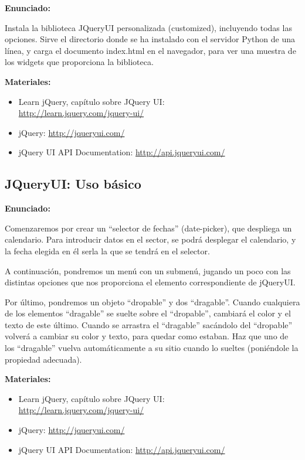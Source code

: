 \textbf{Enunciado:}

Instala la biblioteca JQueryUI personalizada (customized), incluyendo todas las opciones. Sirve el directorio donde se ha instalado con el servidor Python de una línea, y carga el documento index.html en el navegador, para ver una muestra de los widgets que proporciona la biblioteca.

\textbf{Materiales:}

\begin{itemize}
\item Learn jQuery, capítulo sobre JQuery UI: \\
  \url{http://learn.jquery.com/jquery-ui/}
\item jQuery: \url{http://jqueryui.com/}
\item jQuery UI API Documentation: \url{http://api.jqueryui.com/}
\end{itemize}

\subsection{JQueryUI: Uso básico}
\label{subsec:otras-jquery-basico}

\textbf{Enunciado:}

Comenzaremos por crear un ``selector de fechas'' (date-picker), que despliega un calendario. Para introducir datos en el sector, se podrá desplegar el calendario, y la fecha elegida en él serla la que se tendrá en el selector.

A continuación, pondremos un menú con un submenú, jugando un poco con las distintas opciones que nos proporciona el elemento correspondiente de jQueryUI.

Por último, pondremos un objeto ``dropable'' y dos ``dragable''. Cuando cualquiera de los elementos ``dragable'' se suelte sobre el ``dropable'', cambiará el color y el texto de este último. Cuando se arrastra el ``dragable'' sacándolo del ``dropable'' volverá a cambiar su color y texto, para quedar como estaban. Haz que uno de los ``dragable'' vuelva automáticamente a su sitio cuando lo sueltes (poniéndole la propiedad adecuada).

\textbf{Materiales:}

\begin{itemize}
\item Learn jQuery, capítulo sobre JQuery UI: \\
  \url{http://learn.jquery.com/jquery-ui/}
\item jQuery: \url{http://jqueryui.com/}
\item jQuery UI API Documentation: \url{http://api.jqueryui.com/}
\end{itemize}

